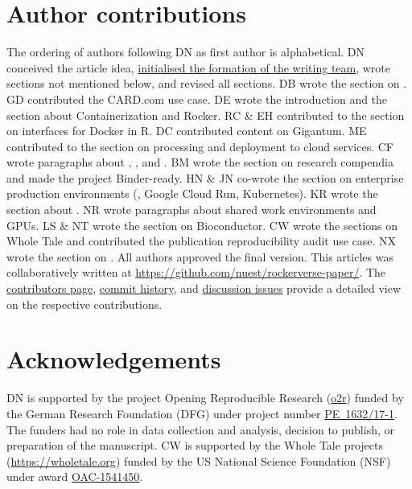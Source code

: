 \hypertarget{author-contributions}{%
\section{Author contributions}\label{author-contributions}}

The ordering of authors following DN as first author is alphabetical. DN
conceived the article idea,
\href{https://github.com/nuest/rockerverse-paper/issues/3}{initialised the formation of the writing team},
wrote sections not mentioned below, and revised all sections. DB wrote
the section on . GD contributed the CARD.com use case. DE
wrote the introduction and the section about Containerization and
Rocker. RC \& EH contributed to the section on interfaces for Docker in
R. DC contributed content on Gigantum. ME contributed to the section on
processing and deployment to cloud services. CF wrote paragraphs about
, ,  and . BM wrote
the section on research compendia and made the project Binder-ready. HN
\& JN co-wrote the section on enterprise production environments
(, Google Cloud Run, Kubernetes). KR wrote the
section about . NR wrote paragraphs about shared work
environments and GPUs. LS \& NT wrote the section on Bioconductor. CW
wrote the sections on Whole Tale and contributed the publication
reproducibility audit use case. NX wrote the section on . All
authors approved the final version. This articles was collaboratively
written at
\href{https://github.com/nuest/rockerverse-paper/}{https://github.com/nuest/rockerverse-paper/}.
The
\href{https://github.com/nuest/rockerverse-paper/graphs/contributors}{contributors page},
\href{https://github.com/nuest/rockerverse-paper/commits/master}{commit history},
and
\href{https://github.com/nuest/rockerverse-paper/issues/}{discussion issues}
provide a detailed view on the respective contributions.

\hypertarget{acknowledgements}{%
\section{Acknowledgements}\label{acknowledgements}}

DN is supported by the project Opening Reproducible Research
(\href{https://www.uni-muenster.de/forschungaz/project/12343}{o2r})
funded by the German Research Foundation (DFG) under project number
\href{https://gepris.dfg.de/gepris/projekt/415851837}{PE~1632/17-1}. The
funders had no role in data collection and analysis, decision to
publish, or preparation of the manuscript. CW is supported by the Whole
Tale projects (\url{https://wholetale.org}) funded by the US National
Science Foundation (NSF) under award
\href{https://www.nsf.gov/awardsearch/showAward?AWD_ID=1541450}{OAC-1541450}.

